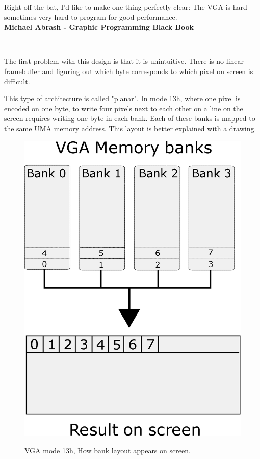 \documentclass[book.tex]{subfiles}
\begin{document}
 \begin{fancyquotes}
   Right off the bat, I'd like to make one thing perfectly clear: The VGA is hard-sometimes very hard-to program for good performance.
 \bigskip \\
\textbf{Michael Abrash - Graphic Programming Black Book}
 \end{fancyquotes}
 \\
\par
The first problem with this design is that it is unintuitive. There is no linear framebuffer and figuring out which byte corresponds to which pixel on screen is difficult.\\
\par
 This type of architecture is called "planar". In mode 13h, where one pixel is encoded on one byte, to write four pixels next to each other on a line on the screen requires writing one byte in each bank. Each of these banks is mapped to the same UMA memory address. This layout is better explained with a drawing.\\
\par
\begin{figure}[H]
\centering
\includegraphics[width=.57\textwidth]{imgs/drawings/vga_ram_screen_layout.eps}
\label{fig:vga_arch}
\caption{VGA mode 13h, How bank layout appears on screen.}
\end{figure}

 
\end{document}
